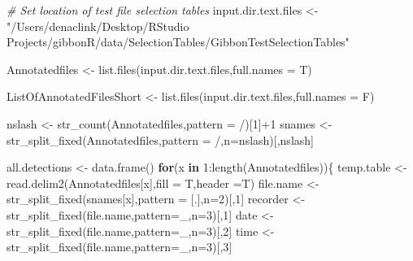 \documentclass[
]{book}
\newenvironment{Shaded}{\begin{snugshade}}{\end{snugshade}}
\newcommand{\AttributeTok}[1]{\textcolor[rgb]{0.77,0.63,0.00}{#1}}
\newcommand{\CommentTok}[1]{\textcolor[rgb]{0.56,0.35,0.01}{\textit{#1}}}
\newcommand{\ControlFlowTok}[1]{\textcolor[rgb]{0.13,0.29,0.53}{\textbf{#1}}}
\newcommand{\DecValTok}[1]{\textcolor[rgb]{0.00,0.00,0.81}{#1}}
\newcommand{\FunctionTok}[1]{\textcolor[rgb]{0.00,0.00,0.00}{#1}}
\newcommand{\NormalTok}[1]{#1}
\newcommand{\OtherTok}[1]{\textcolor[rgb]{0.56,0.35,0.01}{#1}}
\newcommand{\SpecialCharTok}[1]{\textcolor[rgb]{0.00,0.00,0.00}{#1}}
\newcommand{\StringTok}[1]{\textcolor[rgb]{0.31,0.60,0.02}{#1}}
\begin{document}
\begin{Shaded}
\begin{Highlighting}[]
\CommentTok{\# Set location of test file selection tables}
\NormalTok{input.dir.text.files }\OtherTok{\textless{}{-}} \StringTok{"/Users/denaclink/Desktop/RStudio Projects/gibbonR/data/SelectionTables/GibbonTestSelectionTables"}

\NormalTok{Annotatedfiles }\OtherTok{\textless{}{-}} \FunctionTok{list.files}\NormalTok{(input.dir.text.files,}\AttributeTok{full.names =}\NormalTok{ T)}

\NormalTok{ListOfAnnotatedFilesShort }\OtherTok{\textless{}{-}} \FunctionTok{list.files}\NormalTok{(input.dir.text.files,}\AttributeTok{full.names =}\NormalTok{ F)}

\NormalTok{nslash }\OtherTok{\textless{}{-}} \FunctionTok{str\_count}\NormalTok{(Annotatedfiles,}\AttributeTok{pattern =} \StringTok{\textquotesingle{}/\textquotesingle{}}\NormalTok{)[}\DecValTok{1}\NormalTok{]}\SpecialCharTok{+}\DecValTok{1}
\NormalTok{snames }\OtherTok{\textless{}{-}} \FunctionTok{str\_split\_fixed}\NormalTok{(Annotatedfiles,}\AttributeTok{pattern =} \StringTok{\textquotesingle{}/\textquotesingle{}}\NormalTok{,}\AttributeTok{n=}\NormalTok{nslash)[,nslash]}

\NormalTok{all.detections }\OtherTok{\textless{}{-}} \FunctionTok{data.frame}\NormalTok{()}
\ControlFlowTok{for}\NormalTok{(x }\ControlFlowTok{in} \DecValTok{1}\SpecialCharTok{:}\FunctionTok{length}\NormalTok{(Annotatedfiles))\{}
\NormalTok{  temp.table }\OtherTok{\textless{}{-}} \FunctionTok{read.delim2}\NormalTok{(Annotatedfiles[x],}\AttributeTok{fill =}\NormalTok{ T,}\AttributeTok{header =}\NormalTok{T)}
\NormalTok{  file.name }\OtherTok{\textless{}{-}} \FunctionTok{str\_split\_fixed}\NormalTok{(snames[x],}\AttributeTok{pattern =} \StringTok{\textquotesingle{}[.]\textquotesingle{}}\NormalTok{,}\AttributeTok{n=}\DecValTok{2}\NormalTok{)[,}\DecValTok{1}\NormalTok{]}
\NormalTok{  recorder }\OtherTok{\textless{}{-}} \FunctionTok{str\_split\_fixed}\NormalTok{(file.name,}\AttributeTok{pattern=}\StringTok{\textquotesingle{}\_\textquotesingle{}}\NormalTok{,}\AttributeTok{n=}\DecValTok{3}\NormalTok{)[,}\DecValTok{1}\NormalTok{]}
\NormalTok{  date }\OtherTok{\textless{}{-}} \FunctionTok{str\_split\_fixed}\NormalTok{(file.name,}\AttributeTok{pattern=}\StringTok{\textquotesingle{}\_\textquotesingle{}}\NormalTok{,}\AttributeTok{n=}\DecValTok{3}\NormalTok{)[,}\DecValTok{2}\NormalTok{]}
\NormalTok{  time }\OtherTok{\textless{}{-}} \FunctionTok{str\_split\_fixed}\NormalTok{(file.name,}\AttributeTok{pattern=}\StringTok{\textquotesingle{}\_\textquotesingle{}}\NormalTok{,}\AttributeTok{n=}\DecValTok{3}\NormalTok{)[,}\DecValTok{3}\NormalTok{]}
  

\end{Highlighting}
\end{Shaded}
\end{document}
